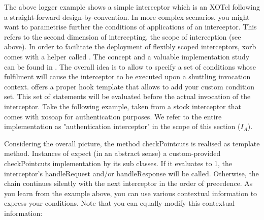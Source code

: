 %
The above logger example shows a simple interceptor which is an XOTcl  following a straight-forward design-by-convention. In more complex scenarios, you might want to parametrise further the conditions of applications of an interceptor. This refers to the second dimension of intercepting, the scope of interception (see above). In order to facilitate the deployment of flexibly scoped interceptors, xorb comes with a helper called . The concept and a valuable implementation study can be found in \cite{zdun:2005}. The overall idea is to allow to specify a set of conditions whose fulfilment will cause the interceptor to be executed upon a shuttling invocation context.  offers a proper hook template that allows to add your custom condition set. This set of statements will be evaluated before the actual invocation of the interceptor. Take the following example, taken from a stock interceptor that comes with xosoap for authentication purposes. We refer to the entire implementation as "authentication interceptor" in the scope of this section (\begin{math}I_A\end{math}).
\lstset{breaklines=true,numbers=left,basicstyle=\footnotesize,frame=single}

Considering the overall picture, the method checkPointcuts is realised as template method. Instances of  expect (in an abstract sense) a custom-provided checkPointcuts implementation by its sub classes. If it evaluates to 1, the interceptor's handleRequest and/or handleResponse will be called. Otherwise, the chain continues silently with the next interceptor in the order of precedence. As you learn from the example above, you can use various contextual information to express your conditions. Note that you can equally modify this contextual information:
